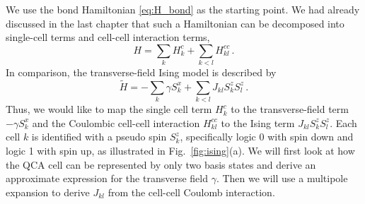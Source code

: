We use the bond Hamiltonian \eqref{eq:H_bond} as the starting point. We
had already discussed in the last chapter that such a Hamiltonian can be
decomposed into single-cell terms and cell-cell interaction terms,
\begin{equation}
  H = \sum_k H^c_k + \sum_{k<l} H^{cc}_{kl} \, .
\end{equation}
In comparison, the transverse-field Ising model is described by
%
\begin{equation}
  \tilde{H} = - \sum_k \gamma S^x_k + \sum_{k<l} J_{kl} S^z_k S^z_l \, .
\end{equation}
%
Thus, we would like to map the single cell term $H^c_k$ to the transverse-field
term $-\gamma S^x_k$ and the Coulombic cell-cell interaction $H^{cc}_{kl}$ to
the Ising term $J_{kl} S^z_k S^z_l$. Each cell $k$ is identified with a pseudo
spin $S^z_k$, specifically logic 0 with spin down and logic 1 with spin up, as
illustrated in Fig.~\ref{fig:ising}(a). We will first look at how the QCA cell
can be represented by only two basis states and derive an approximate expression
for the transverse field $\gamma$. Then we will use a multipole expansion to
derive $J_{kl}$ from the cell-cell Coulomb interaction.

